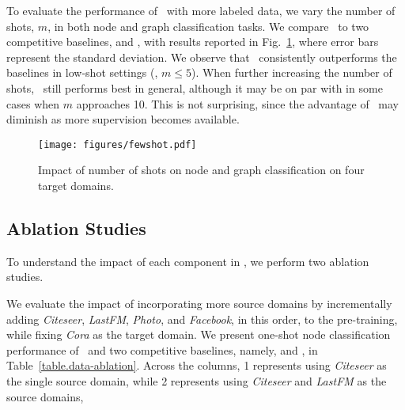 To evaluate the performance of \model\ with more labeled data, we vary the number of shots, $m$, in both node and graph classification tasks. We compare \model\ to two competitive baselines,  and , with results reported in Fig.~\ref{fig.fewshot}, where error bars represent the standard deviation. We observe that \model\ consistently outperforms the baselines in low-shot settings (\eg, $m\le 5$). When further increasing the number of shots, \model\ still performs best in general, although it may be on par with  in some cases when $m$ approaches 10. This is not surprising, since the advantage of \model\ may diminish as more supervision becomes available.

\begin{figure}[tbp]
\centering 
\texttt{[image: figures/fewshot.pdf]}%
 \vspace{-3mm}%
\caption{Impact of number of shots on node and graph classification on four target domains.}
\label{fig.fewshot}
\end{figure}







\subsection{Ablation Studies}\label{sec.ablation}
To understand the impact of each component in \model, we perform two ablation studies.

We evaluate the impact of incorporating more source domains by incrementally adding \textit{Citeseer}, \textit{LastFM}, \textit{Photo}, and \textit{Facebook}, in this order, to the pre-training, while fixing \textit{Cora} as the target domain. 
We present one-shot node classification performance of \model\ and two competitive baselines, namely,  and , in Table~\ref{table.data-ablation}. Across the columns, 1 represents using \textit{Citeseer} as the single source domain, while 2 represents using \textit{Citeseer} and \textit{LastFM} as the source domains, \etc 

